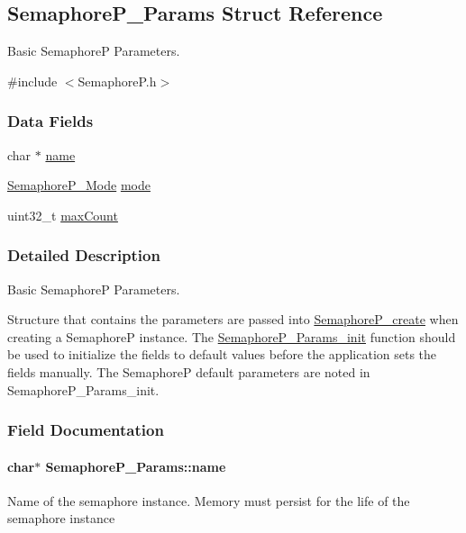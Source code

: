 \subsection{Semaphore\+P\+\_\+\+Params Struct Reference}
\label{struct_semaphore_p___params}


Basic Semaphore\+P Parameters.  




{\ttfamily \#include $<$Semaphore\+P.\+h$>$}

\subsubsection*{Data Fields}
\begin{DoxyCompactItemize}
\item 
char $\ast$ \hyperlink{struct_semaphore_p___params_a2df7611d969720d93463a7c19e52ec28}{name}
\item 
\hyperlink{_semaphore_p_8h_add3b3b8c066d33d0067fac18e839f8ff}{Semaphore\+P\+\_\+\+Mode} \hyperlink{struct_semaphore_p___params_a4d12bb8c19485dd4d4fe2616a41a9948}{mode}
\item 
uint32\+\_\+t \hyperlink{struct_semaphore_p___params_a4fdddd248bfd43a54ed6958a47838f88}{max\+Count}
\end{DoxyCompactItemize}


\subsubsection{Detailed Description}
Basic Semaphore\+P Parameters. 

Structure that contains the parameters are passed into \hyperlink{_semaphore_p_8h_a3fd837348befa046554496e8da2a1fac}{Semaphore\+P\+\_\+create} when creating a Semaphore\+P instance. The \hyperlink{_semaphore_p_8h_a5a2deea3033e8a6aa2564637958efd02}{Semaphore\+P\+\_\+\+Params\+\_\+init} function should be used to initialize the fields to default values before the application sets the fields manually. The Semaphore\+P default parameters are noted in Semaphore\+P\+\_\+\+Params\+\_\+init. 

\subsubsection{Field Documentation}
\paragraph[{name}]{\setlength{\rightskip}{0pt plus 5cm}char$\ast$ Semaphore\+P\+\_\+\+Params\+::name}\label{struct_semaphore_p___params_a2df7611d969720d93463a7c19e52ec28}
Name of the semaphore instance. Memory must persist for the life of the semaphore instance 
